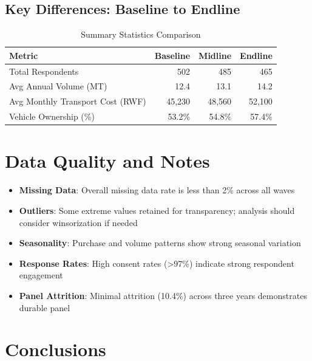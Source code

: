 \documentclass[11pt]{article}
\begin{document}
\subsection{Key Differences: Baseline to Endline}

\begin{table}[h!]
\centering
\caption{Summary Statistics Comparison}
\label{tab:wave_comparison}
\begin{tabularx}{0.95\textwidth}{lrrr}
\toprule
\textbf{Metric} & \textbf{Baseline} & \textbf{Midline} & \textbf{Endline} \\
\midrule
Total Respondents & 502 & 485 & 465 \\
Avg Annual Volume (MT) & 12.4 & 13.1 & 14.2 \\
Avg Monthly Transport Cost (RWF) & 45,230 & 48,560 & 52,100 \\
Vehicle Ownership (\%) & 53.2\% & 54.8\% & 57.4\% \\
\bottomrule
\end{tabularx}
\end{table}

\section{Data Quality and Notes}

\begin{itemize}
    \item \textbf{Missing Data}: Overall missing data rate is less than 2\% across all waves
    \item \textbf{Outliers}: Some extreme values retained for transparency; analysis should consider winsorization if needed
    \item \textbf{Seasonality}: Purchase and volume patterns show strong seasonal variation
    \item \textbf{Response Rates}: High consent rates (>97\%) indicate strong respondent engagement
    \item \textbf{Panel Attrition}: Minimal attrition (10.4\%) across three years demonstrates durable panel
\end{itemize}

\section{Conclusions}
\end{document}
